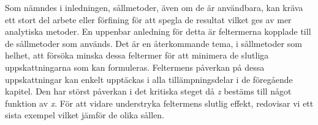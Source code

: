 

Som nämndes i inledningen, sållmetoder, även om de är användbara, kan kräva ett stort del arbete eller förfining för att spegla de resultat vilket ges av mer analytiska metoder. 
En uppenbar anledning för detta är feltermerna kopplade till de sållmetoder som används. 
Det är en återkommande tema, i sållmetoder som helhet, att försöka minska dessa feltermer för att minimera de slutliga uppskattningarna som kan formuleras.
Feltermens påverkan på dessa uppskattningar kan enkelt upptäckas i alla tillämpningsdelar i de föregående kapitel.
Den har störst påverkan i det kritiska steget då \textit{z} bestäms till något funktion av \textit{x}.
För att vidare understryka feltermens slutlig effekt, redovisar vi ett sista exempel vilket jämför de olika sållen.

